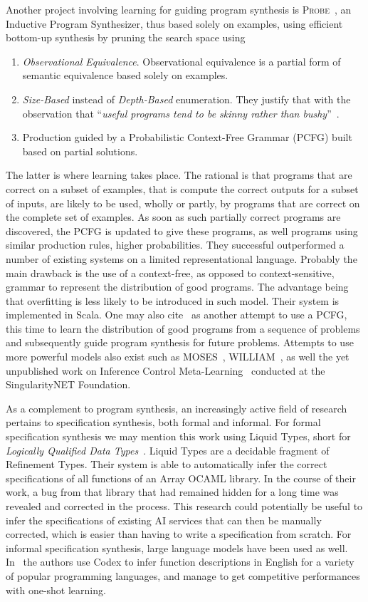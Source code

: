 \documentclass[]{report}
\begin{document}
Another project involving learning for guiding program synthesis is
\textsc{Probe}~\cite{Barke2020}, an Inductive Program Synthesizer,
thus based solely on examples, using efficient bottom-up synthesis by
pruning the search space using
\begin{enumerate}
\item \emph{Observational Equivalence}.  Observational equivalence is
  a partial form of semantic equivalence based solely on examples.
\item \emph{Size-Based} instead of \emph{Depth-Based} enumeration.
  They justify that with the observation that ``\emph{useful programs
    tend to be skinny rather than bushy}''~\cite{}.
\item Production guided by a Probabilistic Context-Free Grammar (PCFG)
  built based on partial solutions.
\end{enumerate}
The latter is where learning takes place.  The rational is that
programs that are correct on a subset of examples, that is compute the
correct outputs for a subset of inputs, are likely to be used, wholly
or partly, by programs that are correct on the complete set of
examples.  As soon as such partially correct programs are discovered,
the PCFG is updated to give these programs, as well programs using
similar production rules, higher probabilities.  They successful
outperformed a number of existing systems on a limited
representational language.  Probably the main drawback is the use of a
context-free, as opposed to context-sensitive, grammar to represent
the distribution of good programs.  The advantage being that
overfitting is less likely to be introduced in such model.  Their
system is implemented in Scala.  One may also cite~\cite{Ozkural2011}
as another attempt to use a PCFG, this time to learn the distribution
of good programs from a sequence of problems and subsequently guide
program synthesis for future problems.  Attempts to use more powerful
models also exist such as MOSES~\cite{Looks2006},
WILLIAM~\cite{Franz2022}, as well the yet unpublished work on
Inference Control Meta-Learning~\cite{Geisweiller2017,
  Geisweiller2018} conducted at the SingularityNET Foundation.

As a complement to program synthesis, an increasingly active field of
research pertains to specification synthesis, both formal and
informal.  For formal specification synthesis we may mention this work
using Liquid Types, short for \emph{Logically Qualified Data
  Types}~\cite{Rondon2008}.  Liquid Types are a decidable fragment of
Refinement Types.  Their system is able to automatically infer the
correct specifications of all functions of an Array OCAML library.  In
the course of their work, a bug from that library that had remained
hidden for a long time was revealed and corrected in the process.
This research could potentially be useful to infer the specifications
of existing AI services that can then be manually corrected, which is
easier than having to write a specification from scratch.  For
informal specification synthesis, large language models have been used
as well.  In~\cite{Khan2023} the authors use Codex to infer function
descriptions in English for a variety of popular programming
languages, and manage to get competitive performances with one-shot
learning.
\end{document}
